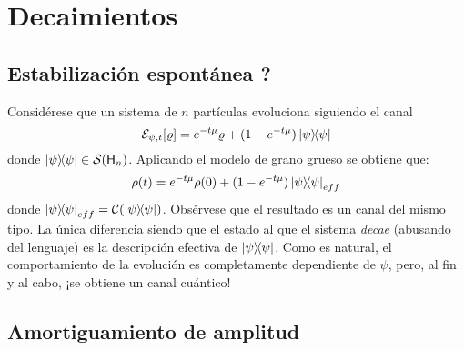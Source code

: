 \section{Decaimientos}

\subsection{Estabilización espontánea ?}
Considérese que un sistema de $n$ partículas evoluciona siguiendo el canal
\begin{equation*}
    \mcE_{\psi,t}[\varrho]=e^{-t\mu}\varrho+(1-e^{-t \mu})\dyad{\psi}
\end{equation*}
donde $\dyad{\psi}\in \densityspace{n}$. Aplicando el modelo de grano grueso se obtiene que:
\begin{equation*}
    \rho(t)=e^{-t\mu}\rho(0)+(1-e^{-t \mu})\dyad{\psi}_{eff}
\end{equation*}
donde $\dyad{\psi}_{eff}=\mcC(\dyad{\psi})$. Obsérvese que el resultado es un canal del mismo tipo. La única diferencia siendo que el estado al que el sistema \textit{decae} (abusando del lenguaje) es la descripción efectiva de $\dyad{\psi}$. Como es natural, el comportamiento de la evolución es completamente dependiente de $\psi$, pero, al fin y al cabo, ¡se obtiene un canal cuántico!

\subsection{Amortiguamiento de amplitud}

